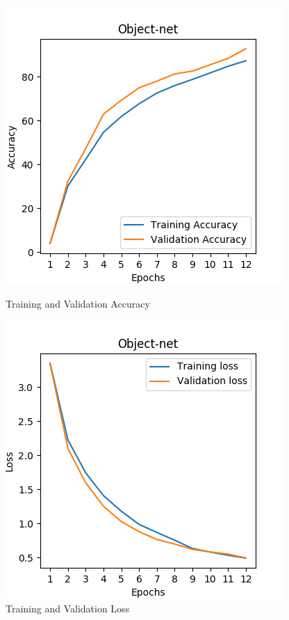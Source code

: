 \begin{figure}[!h]
\centering
\begin{minipage}{0.45\textwidth}
  \centering
        \includegraphics[width=1\linewidth]{images/accuracy.png}
        \caption{Training and Validation Accuracy}
        \label{fig:ground_before}
\end{minipage}%
\begin{minipage}{0.45\textwidth}
  \centering
        \includegraphics[width=1\linewidth]{images/loss.png}
        \caption{Training and Validation Loss}
        \label{fig:after}
\end{minipage}%
\end{figure}








